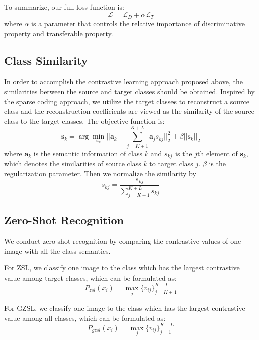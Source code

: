 \documentclass[10pt,twocolumn,letterpaper]{article}
\begin{document}
To summarize, our full loss function is:
\begin{equation}
  \mathcal{L} = \mathcal{L}_D + \alpha \mathcal{L}_T
  \label{equ:full}
\end{equation}
where $\alpha$ is a parameter that controls the relative importance of discriminative property and transferable property.

\subsection{Class Similarity}

In order to accomplish the contrastive learning approach proposed above, the similarities between the source and target classes should be obtained. Inspired by the sparse coding approach, we utilize the target classes to reconstruct a source class and the reconstruction coefficients are viewed as the similarity of the source class to the target classes. The objective function is:
\begin{equation}
  \bm{s}_{k} = \arg \min \limits_{\bm{s}_{k}} ||\bm{a}_k - \sum_{j=K+1}^{K+L} \bm{a}_js_{kj}||_{2}^{2} + \beta||\bm{s}_{k}||_{2}
  \label{equ:class_sim}
\end{equation}
where $\bm{a}_k$ is the semantic information of class $k$ and $s_{kj}$ is the $j$th element of $\bm{s}_{k}$, which denotes the similarities of source class $k$ to target class $j$. $\beta$ is the regularization parameter. Then we normalize the similarity by
\begin{equation}
  s_{kj} = \frac{s_{kj}}{\sum_{j=K+1}^{K+L}s_{kj}}
  \label{equ:norm}
\end{equation}

\subsection{Zero-Shot Recognition}

We conduct zero-shot recognition by comparing the contrastive values of one image with all the class semantics.

For ZSL, we classify one image to the class which has the largest contrastive value among target classes, which can be formulated as:
\begin{equation}
  P_{zsl}(x_i) = \max_j \{v_{ij}\}_{j=K+1}^{K+L}
  \label{equ:zsl}
\end{equation}

For GZSL, we classify one image to the class which has the largest contrastive value among all classes, which can be formulated as:
\begin{equation}
  P_{gzsl}(x_i) = \max_j \{v_{ij}\}_{j=1}^{K+L}
  \label{equ:gzsl}
\end{equation}
\end{document}
